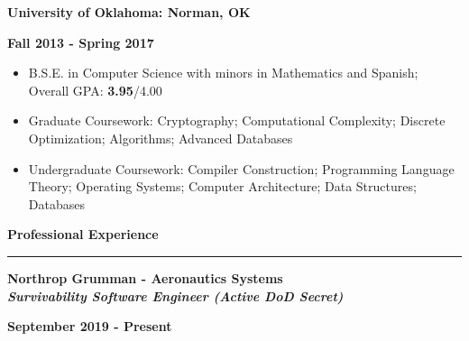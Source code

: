 \documentclass[10pt,letterpaper]{article}
\begin{document}
\begin{minipage}[t]{0.5\textwidth}
    \begin{flushleft}
        \textbf{University of Oklahoma: Norman, OK}\\

    \end{flushleft}
\end{minipage}
\begin{minipage}[t]{0.47\textwidth}
    \begin{flushright}
        \textbf{Fall 2013 - Spring 2017}

    \end{flushright}
\end{minipage}
\begin{itemize}[topsep=0pt]
    \setlength\itemsep{0.1em}
    \item B.S.E. in Computer Science with minors in Mathematics and Spanish;
          Overall GPA: \textbf{3.95}/{4.00}
    \item Graduate Coursework: Cryptography; Computational Complexity; Discrete
          Optimization; Algorithms; Advanced Databases
    \item Undergraduate Coursework: Compiler Construction; Programming Language
          Theory; Operating Systems; Computer Architecture; Data Structures;
          Databases
\end{itemize}

\medskip

\begin{large}
    \textbf{Professional Experience}
\end{large}

\smallskip \hrule \smallskip

\begin{minipage}[t]{0.53\textwidth}
    \begin{flushleft}
        \textbf{Northrop Grumman - Aeronautics Systems}\\
        \textbf{\textit{Survivability Software Engineer (Active DoD Secret)}}\\
    \end{flushleft}
\end{minipage}
\begin{minipage}[t]{0.44\textwidth}
    \begin{flushright}
        \textbf{September 2019 - Present}
    \end{flushright}
\end{minipage}
\end{document}
